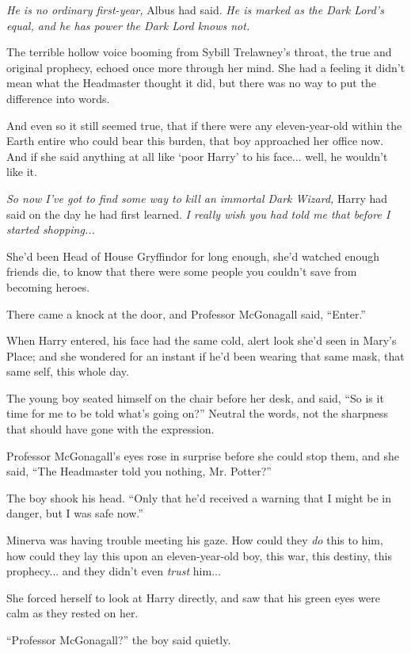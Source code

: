 \emph{He is no ordinary first-year,} Albus had said. \emph{He is marked
as the Dark Lord's equal, and he has power the Dark Lord knows not.}

The terrible hollow voice booming from Sybill Trelawney's throat, the
true and original prophecy, echoed once more through her mind. She had a
feeling it didn't mean what the Headmaster thought it did, but there was
no way to put the difference into words.

And even so it still seemed true, that if there were any eleven-year-old
within the Earth entire who could bear this burden, that boy approached
her office now. And if she said anything at all like `poor Harry' to his
face... well, he wouldn't like it.

\emph{So now I've got to find some way to kill an immortal Dark Wizard,}
Harry had said on the day he had first learned. \emph{I really wish you
had told me that before I started shopping...}

She'd been Head of House Gryffindor for long enough, she'd watched
enough friends die, to know that there were some people you couldn't
save from becoming heroes.

There came a knock at the door, and Professor McGonagall said,
``Enter.''

When Harry entered, his face had the same cold, alert look she'd seen in
Mary's Place; and she wondered for an instant if he'd been wearing that
same mask, that same self, this whole day.

The young boy seated himself on the chair before her desk, and said,
``So is it time for me to be told what's going on?'' Neutral the words,
not the sharpness that should have gone with the expression.

Professor McGonagall's eyes rose in surprise before she could stop them,
and she said, ``The Headmaster told you nothing, Mr. Potter?''

The boy shook his head. ``Only that he'd received a warning that I might
be in danger, but I was safe now.''

Minerva was having trouble meeting his gaze. How could they \emph{do}
this to him, how could they lay this upon an eleven-year-old boy, this
war, this destiny, this prophecy... and they didn't even
\emph{trust} him...

She forced herself to look at Harry directly, and saw that his green
eyes were calm as they rested on her.

``Professor McGonagall?'' the boy said quietly.

